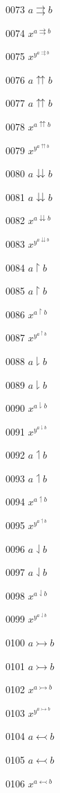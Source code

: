 \documentclass{article}
\begin{document}
0073 $\displaystyle a\rightrightarrows b$\par
0074 $x^{a\rightrightarrows b}$\par
0075 $x^{y^{a\rightrightarrows b}}$\par
0076 $a\upuparrows b$\par
0077 $\displaystyle a\upuparrows b$\par
0078 $x^{a\upuparrows b}$\par
0079 $x^{y^{a\upuparrows b}}$\par
0080 $a\downdownarrows b$\par
0081 $\displaystyle a\downdownarrows b$\par
0082 $x^{a\downdownarrows b}$\par
0083 $x^{y^{a\downdownarrows b}}$\par
0084 $a\upharpoonright b$\par
0085 $\displaystyle a\upharpoonright b$\par
0086 $x^{a\upharpoonright b}$\par
0087 $x^{y^{a\upharpoonright b}}$\par
0088 $a\downharpoonright b$\par
0089 $\displaystyle a\downharpoonright b$\par
0090 $x^{a\downharpoonright b}$\par
0091 $x^{y^{a\downharpoonright b}}$\par
0092 $a\upharpoonleft b$\par
0093 $\displaystyle a\upharpoonleft b$\par
0094 $x^{a\upharpoonleft b}$\par
0095 $x^{y^{a\upharpoonleft b}}$\par
0096 $a\downharpoonleft b$\par
0097 $\displaystyle a\downharpoonleft b$\par
0098 $x^{a\downharpoonleft b}$\par
0099 $x^{y^{a\downharpoonleft b}}$\par
0100 $a\rightarrowtail b$\par
0101 $\displaystyle a\rightarrowtail b$\par
0102 $x^{a\rightarrowtail b}$\par
0103 $x^{y^{a\rightarrowtail b}}$\par
0104 $a\leftarrowtail b$\par
0105 $\displaystyle a\leftarrowtail b$\par
0106 $x^{a\leftarrowtail b}$\par
\end{document}
